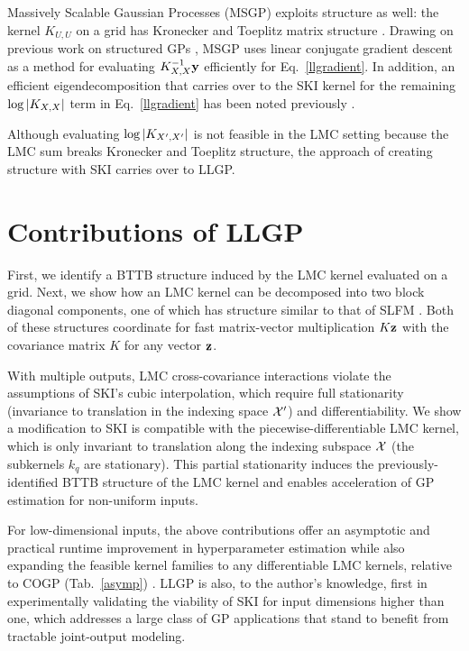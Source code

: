 \documentclass[twoside]{article}
\begin{document}
Massively Scalable Gaussian Processes (MSGP) exploits structure as well: the kernel $K_{U,U}$ on a grid has Kronecker and Toeplitz matrix structure \citep{msgp}. Drawing on previous work on structured GPs \citep{cunningham2008fast, gilboa2015scaling}, MSGP uses linear conjugate gradient descent as a method for evaluating $K_{X,X}^{-1}\textbf{y}$ efficiently for Eq.~\ref{llgradient}. In addition, an efficient eigendecomposition that carries over to the SKI kernel for the remaining $\log\left|K_{X,X}\right|$ term in Eq.~\ref{llgradient} has been noted previously \citep{wilson2014fast}.

Although evaluating $\log\left|K_{X',X'}\right|$ is not feasible in the LMC setting because the LMC sum breaks Kronecker and Toeplitz structure, the approach of creating structure with SKI carries over to LLGP.

\section{Contributions of LLGP}\label{sec:contributions}

First, we identify a BTTB structure induced by the LMC kernel evaluated on a grid. Next, we show how an LMC kernel can be decomposed into two block diagonal components, one of which has structure similar to that of SLFM \citep{seeger2005semiparametric}. Both of these structures coordinate for fast matrix-vector multiplication $K\textbf{z}$ with the covariance matrix $K$ for any vector $\textbf{z}$.

With multiple outputs, LMC cross-covariance interactions violate the assumptions of SKI's cubic interpolation, which require full stationarity (invariance to translation in the indexing space $\mathcal{X}'$) and differentiability. We show a modification to SKI is compatible with the piecewise-differentiable LMC kernel, which is only invariant to translation along the indexing subspace $\mathcal{X}$ (the subkernels $k_q$ are stationary). This partial stationarity induces the previously-identified BTTB structure of the LMC kernel and enables acceleration of GP estimation for non-uniform inputs.

For low-dimensional inputs, the above contributions offer an asymptotic and practical runtime improvement in hyperparameter estimation while also expanding the feasible kernel families to any differentiable LMC kernels, relative to COGP (Tab.~\ref{asymp}) \citep{nguyen2014collaborative}. LLGP is also, to the author's knowledge, first in experimentally validating the viability of SKI for input dimensions higher than one, which addresses a large class of GP applications that stand to benefit from tractable joint-output modeling.
\end{document}
